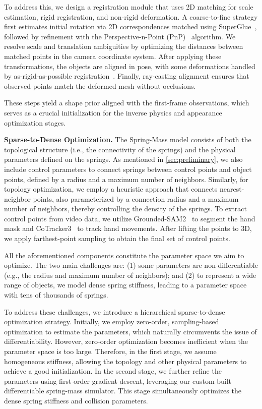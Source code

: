 To address this, we design a registration module that uses 2D matching for scale estimation, rigid registration, and non-rigid deformation. A coarse-to-fine strategy first estimates initial rotation via 2D correspondences matched using SuperGlue~\cite{sarlin2020superglue}, followed by refinement with the Perspective-n-Point (PnP)~\cite{lepetit2009ep} algorithm. We resolve scale and translation ambiguities by optimizing the distances between matched points in the camera coordinate system. After applying these transformations, the objects are aligned in pose, with some deformations handled by as-rigid-as-possible registration~\cite{sorkine2007rigid}. Finally, ray-casting alignment ensures that observed points match the deformed mesh without occlusions.

These steps yield a shape prior aligned with the first-frame observations, which serves as a crucial initialization for the inverse physics and appearance optimization stages.


\textbf{Sparse-to-Dense Optimization.}
The Spring-Mass model consists of both the topological structure (i.e., the connectivity of the springs) and the physical parameters defined on the springs. As mentioned in \cref{sec:preliminary}, we also include control parameters to connect springs between control points and object points, defined by a radius and a maximum number of neighbors.
Similarly, for topology optimization, we employ a heuristic approach that connects nearest-neighbor points, also parameterized by a connection radius and a maximum number of neighbors, thereby controlling the density of the springs. 
To extract control points from video data, we utilize Grounded-SAM2~\cite{ren2024grounded} to segment the hand mask and CoTracker3~\cite{karaev2024cotracker3} to track hand movements. After lifting the points to 3D, we apply farthest-point sampling to obtain the final set of control points.  

All the aforementioned components constitute the parameter space we aim to optimize. The two main challenges are: (1) some parameters are non-differentiable (e.g., the radius and maximum number of neighbors); and (2) to represent a wide range of objects, we model dense spring stiffness, leading to a parameter space with tens of thousands of springs.

To address these challenges, we introduce a hierarchical sparse-to-dense optimization strategy. Initially, we employ zero-order, sampling-based optimization to estimate the parameters, which naturally circumvents the issue of differentiability. However, zero-order optimization becomes inefficient when the parameter space is too large. Therefore, in the first stage, we assume homogeneous stiffness, allowing the topology and other physical parameters to achieve a good initialization.
In the second stage, we further refine the parameters using first-order gradient descent, leveraging our custom-built differentiable spring-mass simulator. This stage simultaneously optimizes the dense spring stiffness and collision parameters.

